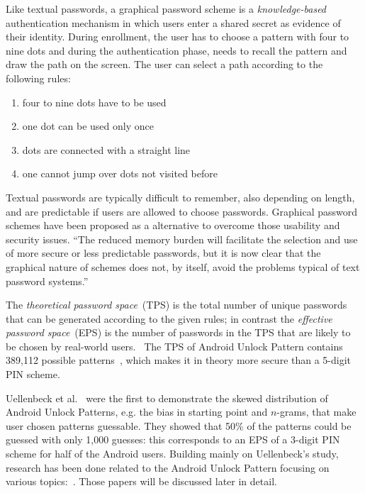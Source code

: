 \documentclass[twocolumn, a4paper, 10pt]{article}
\begin{document}
Like textual passwords, a graphical password scheme is a \textit{knowledge-based} authentication mechanism in which users enter a shared secret as evidence of their identity. During enrollment, the user has to choose a pattern with four to nine dots and during the authentication phase, needs to recall the pattern and draw the path on the screen. The user can select a path according to the following rules:

\begin{enumerate}
	\small
	\setlength\itemsep{0em}
	\item four to nine dots have to be used
	\item one dot can be used only once
	\item dots are connected with a straight line
	\item one cannot jump over dots not visited before
\end{enumerate}

Textual passwords are typically difficult to remember, also depending on length, and are predictable if users are allowed to choose passwords. Graphical password schemes have been proposed as a alternative to overcome those usability and security issues. ``The reduced memory burden will facilitate the selection and use of more secure or less predictable passwords, but it is now clear that the graphical nature of schemes does not, by itself, avoid the problems typical of text password systems.''~\cite{Biddle:2012:GPL:2333112.2333114}

The \textit{theoretical password space}~(TPS) is the total number of unique passwords that can be generated according to the given rules; in contrast the \textit{effective password space}~(EPS)  is the number of passwords in the TPS that are likely to be chosen by real-world users.~\cite{forget2007persuasion} The TPS of Android Unlock Pattern contains 389,112 possible patterns~\cite{Aviv:2010:SAS:1925004.1925009}, which makes it in theory more secure than a 5-digit PIN scheme.

Uellenbeck et al.~\cite{Uellenbeck:2013:QSG:2508859.2516700} were the first to demonstrate the skewed distribution of Android Unlock Patterns, e.g. the bias in starting point and $n$-grams, that make user chosen patterns guessable. They showed that 50\% of the patterns could be guessed with only 1,000 guesses: this corresponds to an EPS of a 3-digit PIN scheme for half of the Android users. Building mainly on Uellenbeck's study, research has been done related to the Android Unlock Pattern focusing on various topics:~\cite{Sun2014308, siadati2015fortifying, Aviv:2014:UVP:2664243.2664253, Andriotis:2013:PSS:2462096.2462098}. Those papers will be discussed later in detail.
\end{document}
